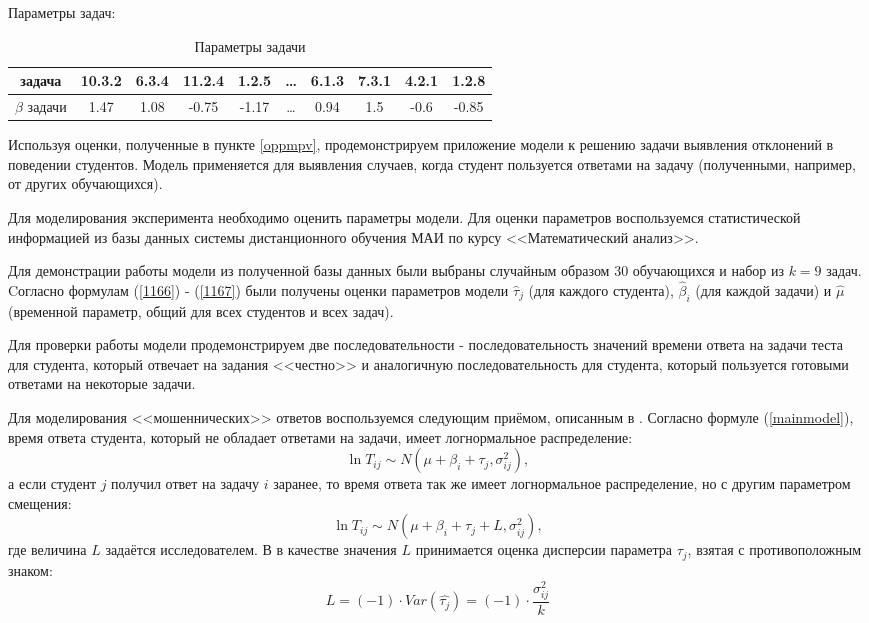 Параметры задач:
\begin{table}[H]
\caption{Параметры задачи}
\label{tabular:IRTtable}
\begin{center}
\begin{tabular}
{|c	|c	|c	|c	|c	|c	|c	|c	|c	|c|}
\hline
задача  		&	10.3.2		&	6.3.4		&	11.2.4		&	1.2.5		&	\ldots		&	6.1.3		&	7.3.1		&	4.2.1		&	1.2.8	\\ 
\hline
$\beta$ задачи	&	1.47		&	1.08		&	-0.75		&	-1.17		&	\ldots		&	0.94		&	1.5		&	-0.6		&	-0.85	\\
\hline
\end{tabular}
\end{center}
\end{table}

Используя оценки, полученные в пункте \ref{oppmpv}, продемонстрируем при\-ложение модели к решению задачи выявления отклонений в поведении сту\-дентов. Модель приме\-няется для выявления случаев, когда студент поль\-зуется ответами на задачу\cite{4.} (полученными, например, от других обуча\-ющихся).

Для моделирования эксперимента необходимо оценить параметры модели. Для оценки параметров воспользуемся статистической информацией из базы данных системы дис\-танционного обучения МАИ по курсу <<Математический анализ>>.


Для демонстрации работы модели из полученной базы данных были выб\-раны случайным образом $30$ обучающихся и набор из $k=9$ задач. Cогласно формулам (\ref{1166}) - (\ref{1167}) были получены оценки параметров модели $\hat{\tau}_j$ (для каждого студента), $\hat{\beta}_i$ (для каждой задачи) и $\hat{\mu}$ (временной параметр, общий для всех студентов и всех задач).

Для проверки работы модели продемонстрируем две последовательности - после\-довательность значений времени ответа на задачи теста для студента, который отвечает на задания <<честно>> и аналогичную последовательность для студента, который пользуется готовыми ответами на некоторые задачи.

Для моделирования <<мошеннических>> ответов воспользуемся следующим приёмом, описанным в \cite{5.}. Согласно формуле (\ref{mainmodel}), время ответа студента, который не обладает ответами на задачи, имеет логнормальное распределение:
$$
\ln T_{ij} \sim N (\mu + \beta_i + \tau_j, \sigma^{2}_{ij}),
$$
а если студент $j$ получил ответ на задачу $i$ заранее, то время ответа так же имеет логнормальное распределение, но с другим параметром смещения:
$$
\ln T_{ij} \sim N (\mu + \beta_i + \tau_j + L, \sigma^{2}_{ij}),
$$
где величина $L$ задаётся исследователем. В \cite{6.} в качестве значения $L$ при\-нимается оценка дисперсии параметра $\tau_j$, взятая с противо\-положным знаком:
\begin{equation}
\label{fraudlevel}
L = (-1)\cdot Var\left( \hat{\tau_j}\right) = (-1)\cdot \frac{\sigma^{2}_{ij}} {k}
\end{equation}



